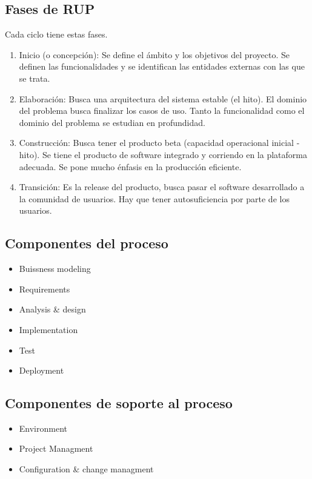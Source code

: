 \documentclass[titlepage,a4paper]{article}
\begin{document}
\subsection*{Fases de RUP}
Cada ciclo tiene estas fases.

\begin{enumerate}
    \item Inicio (o concepción): Se define el ámbito y los objetivos del proyecto. Se definen las funcionalidades y se identifican las entidades externas con las que se trata.
    \item Elaboración: Busca una arquitectura del sistema estable (el hito). El dominio del problema busca finalizar los casos de uso. Tanto la funcionalidad como el dominio del problema se estudian en profundidad.
    \item Construcción: Busca tener el producto beta (capacidad operacional inicial - hito). Se tiene el producto de software integrado y corriendo en la plataforma adecuada. Se pone mucho énfasis en la producción eficiente.
    \item Transición: Es la release del producto, busca pasar el software desarrollado a la comunidad de usuarios. Hay que tener autosuficiencia por parte de los usuarios.
\end{enumerate}

\subsection*{Componentes del proceso}
\begin{itemize}
    \item Buissness modeling
    \item Requirements
    \item Analysis \& design
    \item Implementation
    \item Test
    \item Deployment
\end{itemize}

\subsection*{Componentes de soporte al proceso}
\begin{itemize}
    \item Environment
    \item Project Managment
    \item Configuration \& change managment
\end{itemize}
\end{document}
